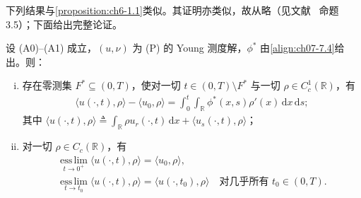﻿\documentclass[../../main.tex]{subfiles}%
\begin{document}
下列结果与\cref{proposition:ch6-1.1}类似。其证明亦类似，故从略（见文献~\cite{ref17} 命题 3.5）；下面给出完整论证。

\begin{proposition}\label{proposition:ch07-7.1.1}
设 (A0)--(A1) 成立，$(u,\nu)$ 为 (P) 的 Young 测度解，$\phi^*$ 由\eqref{align:ch07-7.4}给出。则：
\begin{enumerate}[(i)]
\item 存在零测集 $F^*\subseteq(0,T)$，使对一切 $t\in(0,T)\setminus F^*$ 与一切 $\rho\in C_c^1(\mathbb{R})$，有
\begin{align}
\langle u(\cdot,t),\rho\rangle-\langle u_0,\rho\rangle
=\int_0^t\int_{\mathbb{R}}\phi^*(x,s)\rho'(x)\,\mathrm{d}x\,\mathrm{d}s; \label{align:ch07-7.11}
\end{align}
其中 $\langle u(\cdot,t),\rho\rangle\triangleq\int_{\mathbb{R}}\rho u_r(\cdot,t)\,\mathrm{d}x+\langle u_s(\cdot,t),\rho\rangle$；
\item 对一切 $\rho\in C_c(\mathbb{R})$，有
\begin{align}
\operatorname*{ess\,lim}_{t\to0^+}\langle u(\cdot,t),\rho\rangle=\langle u_0,\rho\rangle, \label{align:ch07-7.12}\\
\operatorname*{ess\,lim}_{t\to t_0}\langle u(\cdot,t),\rho\rangle=\langle u(\cdot,t_0),\rho\rangle
\quad\text{对几乎所有 }t_0\in(0,T). \label{align:ch07-7.13}
\end{align}
\end{enumerate}
\end{proposition}
\end{document}
